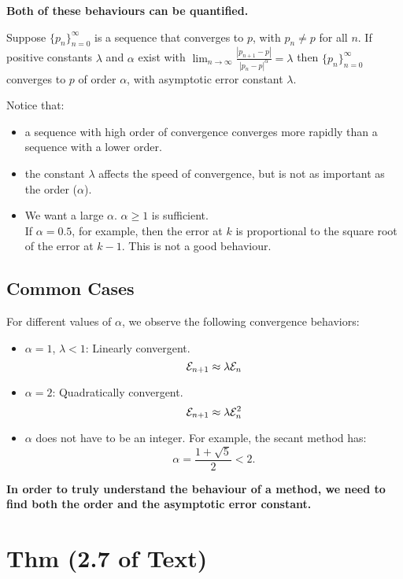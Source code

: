 \textbf{Both of these behaviours can be quantified.}

\noindent{} Suppose $\{ p_n \}_{n=0}^\infty$ is a sequence that converges to $p$,
with $p_n \neq p$ for all $n$. If positive constants $\lambda$ and $\alpha$
exist with $\displaystyle \lim_{n\to\infty} \frac{|p_{n+1}-p|}{|p_n -p|^\alpha} = \lambda$
then $\{ p_n \}_{n=0}^\infty$ converges to $p$ of order $\alpha$, with asymptotic
error constant $\lambda$.

Notice that:
\begin{itemize}
\item a sequence with high order of convergence converges more rapidly than a
  sequence with a lower order.
\item the constant $\lambda$ affects the speed of convergence, but is not as
  important as the order ($\alpha$).
\item We want a large $\alpha$. $\alpha \geq 1$ is sufficient. \\
  If $\alpha = 0.5$, for example, then the error at $k$ is proportional
  to the square root of the error at $k-1$. This is not a good behaviour.
\end{itemize}

\subsection{Common Cases}

For different values of $\alpha$, we observe the following convergence behaviors:

\begin{itemize}
    \item $\alpha = 1$, $\lambda < 1$: Linearly convergent.
    \[ \mathcal{E}_{n+1} \approx \lambda \mathcal{E}_n \]
    
    \item $\alpha = 2$: Quadratically convergent.
    \[ \mathcal{E}_{n+1} \approx \lambda \mathcal{E}_n^2 \]
    
    \item $\alpha$ does not have to be an integer. For example, the secant method has:
    \[ \alpha = \frac{1+\sqrt{5}}{2} < 2. \]
\end{itemize}

\textbf{In order to truly understand the behaviour of a method, we need to
  find both the order and the asymptotic error constant.}

\section{Thm (2.7 of Text)}

